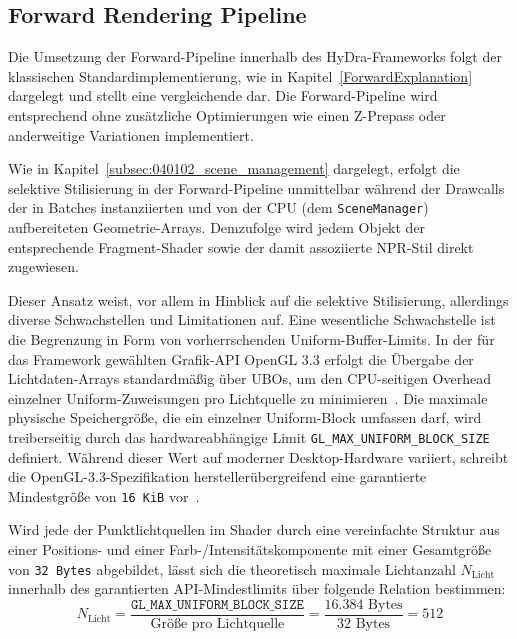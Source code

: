 \subsection{Forward Rendering Pipeline}
\label{subsec:040201_forward_pipeline}

Die Umsetzung der Forward-Pipeline innerhalb des \ac{HyDra}-Frameworks folgt der klassischen
Standardimplementierung, wie in Kapitel~\ref{ForwardExplanation} dargelegt und stellt eine vergleichende
 dar.
Die Forward-Pipeline wird entsprechend ohne zusätzliche Optimierungen wie einen Z-Prepass oder anderweitige Variationen
implementiert.

Wie in Kapitel~\ref{subsec:040102_scene_management} dargelegt, erfolgt die selektive Stilisierung in der
Forward-Pipeline unmittelbar während der Drawcalls der in Batches instanziierten und von der \ac{CPU}
(dem \texttt{SceneManager}) aufbereiteten Geometrie-Arrays.
Demzufolge wird jedem Objekt der entsprechende Fragment-Shader sowie der damit assoziierte \ac{NPR}-Stil direkt
zugewiesen.

Dieser Ansatz weist, vor allem in Hinblick auf die selektive Stilisierung, allerdings diverse Schwachstellen und
Limitationen auf.
Eine wesentliche Schwachstelle ist die Begrenzung in Form von vorherrschenden Uniform-Buffer-Limits.
In der für das Framework gewählten Grafik-\ac{API} OpenGL 3.3 erfolgt die Übergabe der Lichtdaten-Arrays standardmäßig über
\ac{UBO}s, um den \ac{CPU}-seitigen Overhead einzelner Uniform-Zuweisungen pro Lichtquelle zu
minimieren~\cite[S.~798]{akenine-mollerRealtimeRendering2019}.
Die maximale physische Speichergröße, die ein einzelner Uniform-Block umfassen darf, wird treiberseitig durch das
hardwareabhängige Limit \texttt{GL\_MAX\_UNIFORM\_BLOCK\_SIZE} definiert.
Während dieser Wert auf moderner Desktop-Hardware variiert, schreibt die OpenGL-3.3-Spezifikation herstellerübergreifend
eine garantierte Mindestgröße von \texttt{16 KiB} vor~\cite[S.~321, Tab.~6.45]{OpenGL33Core2010}.

Wird jede der Punktlichtquellen im Shader durch eine vereinfachte Struktur aus einer Positions- und einer
Farb-/Intensitätskomponente mit einer Gesamtgröße von \texttt{32 Bytes} abgebildet, lässt sich die theoretisch maximale
Lichtanzahl $N_{\text{Licht}}$ innerhalb des garantierten \ac{API}-Mindestlimits über folgende Relation bestimmen:
\begin{equation}
    N_{\text{Licht}} = \frac{\texttt{GL\_MAX\_UNIFORM\_BLOCK\_SIZE}}{\text{Größe pro Lichtquelle}} =
    \frac{16.384\text{ Bytes}}{32\text{ Bytes}} = 512
    \label{eq:ubo-limits}
\end{equation}

